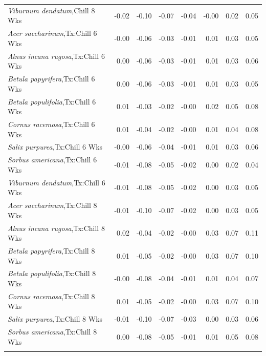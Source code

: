 \documentclass{article}\usepackage[]{graphicx}\usepackage[]{color}
\begin{document}
\begin{longtable}{lrrrrrrr}
  \textit{Viburnum dendatum},Chill 8 Wks & -0.02 & -0.10 & -0.07 & -0.04 & -0.00 & 0.02 & 0.05 \\ 
  \textit{Acer saccharinum},Tx:Chill 6 Wks & -0.00 & -0.06 & -0.03 & -0.01 & 0.01 & 0.03 & 0.05 \\ 
  \textit{Alnus incana rugosa},Tx:Chill 6 Wks & 0.00 & -0.06 & -0.03 & -0.01 & 0.01 & 0.03 & 0.06 \\ 
  \textit{Betula papyrifera},Tx:Chill 6 Wks & 0.00 & -0.06 & -0.03 & -0.01 & 0.01 & 0.03 & 0.05 \\ 
  \textit{Betula populifolia},Tx:Chill 6 Wks & 0.01 & -0.03 & -0.02 & -0.00 & 0.02 & 0.05 & 0.08 \\ 
  \textit{Cornus racemosa},Tx:Chill 6 Wks & 0.01 & -0.04 & -0.02 & -0.00 & 0.01 & 0.04 & 0.08 \\ 
  \textit{Salix purpurea},Tx:Chill 6 Wks & -0.00 & -0.06 & -0.04 & -0.01 & 0.01 & 0.03 & 0.06 \\ 
  \textit{Sorbus americana},Tx:Chill 6 Wks & -0.01 & -0.08 & -0.05 & -0.02 & 0.00 & 0.02 & 0.04 \\ 
  \textit{Viburnum dendatum},Tx:Chill 6 Wks & -0.01 & -0.08 & -0.05 & -0.02 & 0.00 & 0.03 & 0.05 \\ 
  \textit{Acer saccharinum},Tx:Chill 8 Wks & -0.01 & -0.10 & -0.07 & -0.02 & 0.00 & 0.03 & 0.05 \\ 
  \textit{Alnus incana rugosa},Tx:Chill 8 Wks & 0.02 & -0.04 & -0.02 & -0.00 & 0.03 & 0.07 & 0.11 \\ 
  \textit{Betula papyrifera},Tx:Chill 8 Wks & 0.01 & -0.05 & -0.02 & -0.00 & 0.03 & 0.07 & 0.10 \\ 
  \textit{Betula populifolia},Tx:Chill 8 Wks & -0.00 & -0.08 & -0.04 & -0.01 & 0.01 & 0.04 & 0.07 \\ 
  \textit{Cornus racemosa},Tx:Chill 8 Wks & 0.01 & -0.05 & -0.02 & -0.00 & 0.03 & 0.07 & 0.10 \\ 
  \textit{Salix purpurea},Tx:Chill 8 Wks & -0.01 & -0.10 & -0.07 & -0.03 & 0.00 & 0.03 & 0.06 \\ 
  \textit{Sorbus americana},Tx:Chill 8 Wks & 0.00 & -0.08 & -0.05 & -0.01 & 0.01 & 0.05 & 0.08 \\ 
   \hline
\hline
\label{tab:suppmodtough}
\end{longtable}
\end{document}
